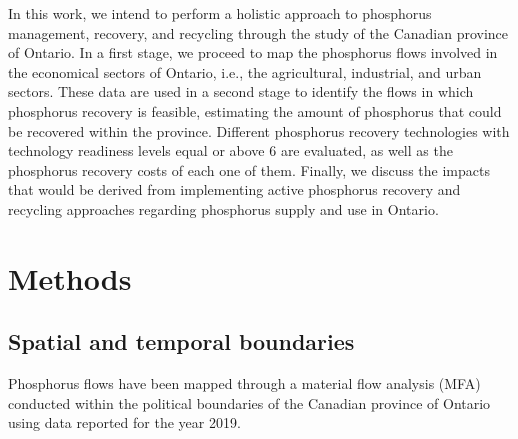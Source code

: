 \documentclass[]{elsarticle}
\begin{document}
In this work, we intend to perform a holistic approach to phosphorus management,
recovery, and recycling through the study of the Canadian province of Ontario. In a first stage, we proceed to map the phosphorus flows involved in the economical sectors of Ontario, i.e., the agricultural, industrial, and urban sectors. These data are used in a second stage to identify the flows in which phosphorus recovery is feasible, estimating the amount of phosphorus that could be recovered within the province.
Different phosphorus recovery technologies with technology readiness levels equal or above 6 are evaluated, as well as the phosphorus recovery costs of each one of them. Finally, we discuss the impacts that would be derived from implementing active phosphorus recovery and recycling approaches regarding phosphorus supply and use in Ontario.

\section{Methods}

%

\subsection{Spatial  and temporal boundaries}
Phosphorus flows have been mapped through a material flow analysis (MFA) \citep{brunner2016handbook} conducted within the political boundaries of the Canadian province of Ontario using data reported for the year 2019. 
%
%
\end{document}
